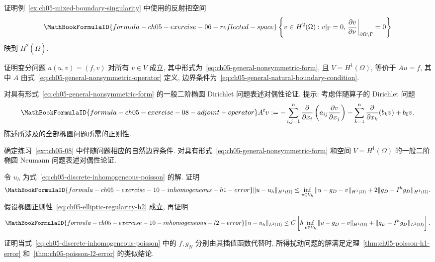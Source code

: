 \begin{MBExercise}
\label{exr:ch05-06}
证明例~\ref{ex:ch05-mixed-boundary-singularity} 中使用的反射把空间
\[
\MathBookFormulaID{formula-ch05-exercise-06-reflected-space}
\left\{v\in H^2(\Omega):v|_\Gamma=0,
\left.\frac{\partial v}{\partial\nu}\right|_{\partial\Omega\setminus\Gamma}=0\right\}
\]
映到 $H^2(\widetilde\Omega)$.
\end{MBExercise}

\begin{MBExercise}
\label{exr:ch05-07}
证明变分问题 $a(u,v)=(f,v)$ 对所有 $v\in V$ 成立, 其中形式为~\eqref{eq:ch05-general-nonsymmetric-form}, 且 $V=H^1(\Omega)$, 等价于 $Au=f$, 其中 $A$ 由式~\eqref{eq:ch05-general-nonsymmetric-operator} 定义, 边界条件为~\eqref{eq:ch05-general-natural-boundary-condition}.
\end{MBExercise}

\begin{MBExercise}
\label{exr:ch05-08}
对具有形式~\eqref{eq:ch05-general-nonsymmetric-form} 的一般二阶椭圆 Dirichlet 问题表述对偶性论证. 提示: 考虑伴随算子的 Dirichlet 问题
\[
\MathBookFormulaID{formula-ch05-exercise-08-adjoint-operator}
A^tv:=-\sum_{i,j=1}^n\frac{\partial}{\partial x_i}
\left(a_{ij}\frac{\partial v}{\partial x_j}\right)
-\sum_{k=1}^n\frac{\partial}{\partial x_k}(b_kv)+b_0v.
\]
陈述所涉及的全部椭圆问题所需的正则性.
\end{MBExercise}

\begin{MBExercise}
\label{exr:ch05-09}
确定练习~\ref{exr:ch05-08} 中伴随问题相应的自然边界条件. 对具有形式~\eqref{eq:ch05-general-nonsymmetric-form} 和空间 $V=H^1(\Omega)$ 的一般二阶椭圆 Neumann 问题表述对偶性论证.
\end{MBExercise}

\begin{MBExercise}
\label{exr:ch05-10}
令 $u_h$ 为式~\eqref{eq:ch05-discrete-inhomogeneous-poisson} 的解. 证明
\[
\MathBookFormulaID{formula-ch05-exercise-10-inhomogeneous-h1-error}
\|u-u_h\|_{H^1(\Omega)}
\leq\inf_{v\in V_h}\|u-g_D-v\|_{H^1(\Omega)}
+2\|g_D-I^h g_D\|_{H^1(\Omega)}.
\]
假设椭圆正则性~\eqref{eq:ch05-elliptic-regularity-h2} 成立, 再证明
\[
\MathBookFormulaID{formula-ch05-exercise-10-inhomogeneous-l2-error}
\|u-u_h\|_{L^2(\Omega)}
\leq C\left[h\inf_{v\in V_h}\|u-g_D-v\|_{H^1(\Omega)}
+\|g_D-I^h g_D\|_{L^2(\Omega)}\right].
\]
\end{MBExercise}

\begin{MBExercise}
\label{exr:ch05-11}
证明当式~\eqref{eq:ch05-discrete-inhomogeneous-poisson} 中的 $f,g_N$ 分别由其插值函数代替时, 所得扰动问题的解满足定理~\ref{thm:ch05-poisson-h1-error} 和~\ref{thm:ch05-poisson-l2-error} 的类似结论.
\end{MBExercise}

